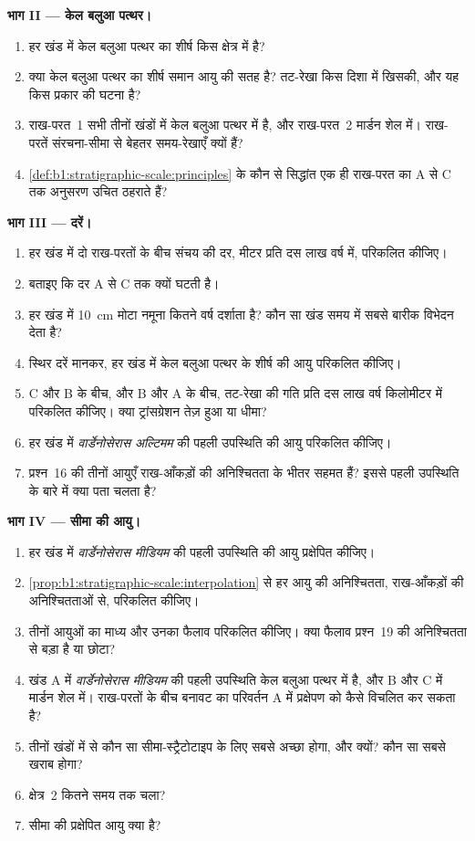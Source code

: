 \begin{problem}
\noindent\textbf{भाग II --- केल बलुआ पत्थर।}
\begin{enumerate}[resume]
  \item हर खंड में केल बलुआ पत्थर का शीर्ष किस क्षेत्र में है?
  \item क्या केल बलुआ पत्थर का शीर्ष समान आयु की सतह है? तट-रेखा किस दिशा में खिसकी, और यह किस प्रकार की घटना है?
  \item राख-परत~1 सभी तीनों खंडों में केल बलुआ पत्थर में है, और राख-परत~2 मार्डन शेल में। राख-परतें संरचना-सीमा से बेहतर समय-रेखाएँ क्यों हैं?
  \item \cref{def:b1:stratigraphic-scale:principles} के कौन से सिद्धांत एक ही राख-परत का A से C तक अनुसरण उचित ठहराते हैं?
\end{enumerate}

\noindent\textbf{भाग III --- दरें।}
\begin{enumerate}[resume]
  \item हर खंड में दो राख-परतों के बीच संचय की दर, मीटर प्रति दस लाख वर्ष में, परिकलित कीजिए।
  \item बताइए कि दर A से C तक क्यों घटती है।
  \item हर खंड में \qty{10}{cm} मोटा नमूना कितने वर्ष दर्शाता है? कौन सा खंड समय में सबसे बारीक विभेदन देता है?
  \item स्थिर दरें मानकर, हर खंड में केल बलुआ पत्थर के शीर्ष की आयु परिकलित कीजिए।
  \item C और B के बीच, और B और A के बीच, तट-रेखा की गति प्रति दस लाख वर्ष किलोमीटर में परिकलित कीजिए। क्या ट्रांसग्रेशन तेज़ हुआ या धीमा?
  \item हर खंड में \emph{वार्डेनोसेरास अल्टिमम} की पहली उपस्थिति की आयु परिकलित कीजिए।
  \item प्रश्न~16 की तीनों आयुएँ राख-आँकड़ों की अनिश्चितता के भीतर सहमत हैं? इससे पहली उपस्थिति के बारे में क्या पता चलता है?
\end{enumerate}

\noindent\textbf{भाग IV --- सीमा की आयु।}
\begin{enumerate}[resume]
  \item हर खंड में \emph{वार्डेनोसेरास मीडियम} की पहली उपस्थिति की आयु प्रक्षेपित कीजिए।
  \item \cref{prop:b1:stratigraphic-scale:interpolation} से हर आयु की अनिश्चितता, राख-आँकड़ों की अनिश्चितताओं से, परिकलित कीजिए।
  \item तीनों आयुओं का माध्य और उनका फैलाव परिकलित कीजिए। क्या फैलाव प्रश्न~19 की अनिश्चितता से बड़ा है या छोटा?
  \item खंड A में \emph{वार्डेनोसेरास मीडियम} की पहली उपस्थिति केल बलुआ पत्थर में है, और B और C में मार्डन शेल में। राख-परतों के बीच बनावट का परिवर्तन A में प्रक्षेपण को कैसे विचलित कर सकता है?
  \item तीनों खंडों में से कौन सा सीमा-स्ट्रैटोटाइप के लिए सबसे अच्छा होगा, और क्यों? कौन सा सबसे खराब होगा?
  \item क्षेत्र~2 कितने समय तक चला?
  \item सीमा की प्रक्षेपित आयु क्या है?
\end{enumerate}
\end{problem}
